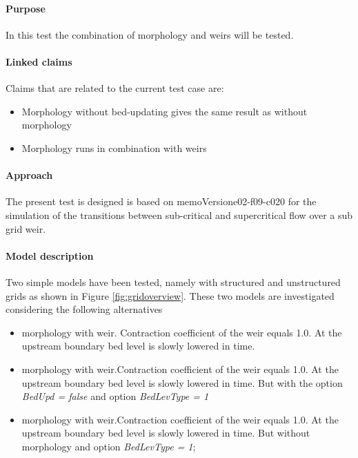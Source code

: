 


\paragraph*{Purpose}
In this test the combination of morphology and weirs will be tested. 

\paragraph*{Linked claims}
Claims that are related to the current test case are:
\begin{itemize}
\item Morphology without bed-updating gives the same result as without morphology
\item Morphology runs in combination with weirs
\end{itemize}

\paragraph*{Approach}
The present test is designed is based on memoVersion{e02-f09-c020} for the simulation of the transitions between sub-critical and supercritical flow over a sub grid weir.


\paragraph*{Model description}

Two simple models have been tested, namely with structured and unstructured grids as shown in Figure \ref{fig:gridoverview}. These two models are investigated considering the following alternatives

\begin {itemize}
\item morphology with weir. Contraction coefficient of the weir equals 1.0. At the upstream boundary  bed level is slowly lowered in time.
\item morphology with weir.Contraction coefficient of the weir equals 1.0. At the upstream boundary  bed level is slowly lowered in time. But with the option \emph{BedUpd = false} and option \emph{BedLevType = 1}
\item morphology with weir.Contraction coefficient of the weir equals 1.0. At the upstream boundary  bed level is slowly lowered in time. But without morphology and option \emph{BedLevType = 1};
\end{itemize}

